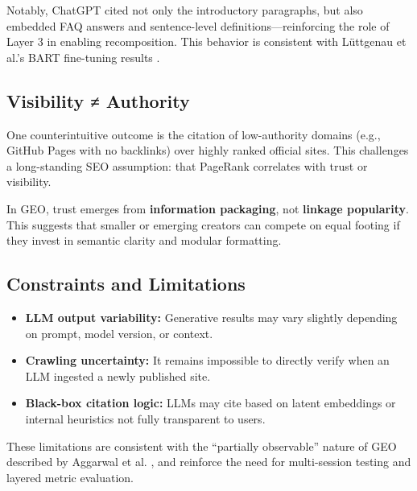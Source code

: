 Notably, ChatGPT cited not only the introductory paragraphs, but also embedded FAQ answers and sentence-level definitions---reinforcing the role of Layer 3 in enabling recomposition. This behavior is consistent with Lüttgenau et al.’s BART fine-tuning results \cite{luttgenau2025beyondseo}.

\subsection{Visibility ≠ Authority}

One counterintuitive outcome is the citation of low-authority domains (e.g., GitHub Pages with no backlinks) over highly ranked official sites. This challenges a long-standing SEO assumption: that PageRank correlates with trust or visibility.

In GEO, trust emerges from \textbf{information packaging}, not \textbf{linkage popularity}. This suggests that smaller or emerging creators can compete on equal footing if they invest in semantic clarity and modular formatting.

\subsection{Constraints and Limitations}

\begin{itemize}
  \item \textbf{LLM output variability:} Generative results may vary slightly depending on prompt, model version, or context.
  \item \textbf{Crawling uncertainty:} It remains impossible to directly verify when an LLM ingested a newly published site.
  \item \textbf{Black-box citation logic:} LLMs may cite based on latent embeddings or internal heuristics not fully transparent to users.
\end{itemize}

These limitations are consistent with the “partially observable” nature of GEO described by Aggarwal et al. \cite{aggarwal2024geo}, and reinforce the need for multi-session testing and layered metric evaluation.
